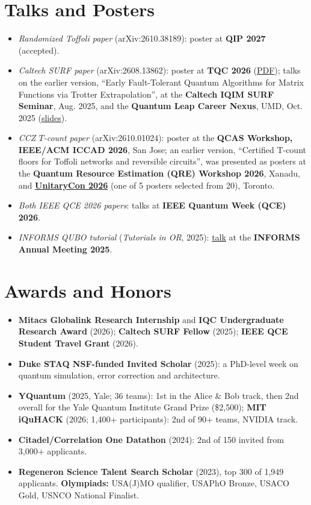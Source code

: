 \documentclass[letterpaper,10pt]{article}
\begin{document}
\section{Talks and Posters}
\begin{itemize}\small
  \item \emph{Randomized Toffoli paper} (arXiv:2610.38189): poster at \textbf{QIP 2027} (accepted).
  \item \emph{Caltech SURF paper} (arXiv:2608.13862): poster at \textbf{TQC 2026}
  (\href{https://arulrhikm.github.io/media/documents/tqc2026-commutator-scaling-poster.pdf}{PDF}); talks on the earlier version, ``Early Fault-Tolerant
  Quantum Algorithms for Matrix Functions via Trotter Extrapolation'', at the \textbf{Caltech IQIM SURF Seminar}, Aug. 2025,
  and the \textbf{Quantum Leap Career Nexus}, UMD, Oct. 2025 (\href{https://arulrhikm.github.io/media/documents/surf2025-matrix-functions-slides.pdf}{slides}).
  \item \emph{CCZ $T$-count paper} (arXiv:2610.01024): poster at the \textbf{QCAS Workshop, IEEE/ACM ICCAD 2026}, San Jose;
  an earlier version, ``Certified T-count floors for Toffoli networks and reversible circuits'', was presented as posters at
  the \textbf{Quantum Resource Estimation (QRE) Workshop 2026}, Xanadu, and \href{https://unitary.foundation/posts/2026_ucon_recap/}{\textbf{UnitaryCon 2026}} (one of 5 posters selected from 20), Toronto.
  \item \emph{Both IEEE QCE 2026 papers}: talks at \textbf{IEEE Quantum Week (QCE) 2026}.
  \item \emph{INFORMS QUBO tutorial} (\textit{Tutorials in OR}, 2025): \href{https://arulrhikm.github.io/media/slides/QUBOonQCslides.pdf}{talk} at the \textbf{INFORMS Annual Meeting 2025}.
\end{itemize}

\section{Awards and Honors}
\begin{itemize}\small
  \item \textbf{Mitacs Globalink Research Internship} and \textbf{IQC Undergraduate Research Award} (2026);
  \textbf{Caltech SURF Fellow} (2025); \textbf{IEEE QCE Student Travel Grant} (2026).
  \item \textbf{Duke STAQ NSF-funded Invited Scholar} (2025): a PhD-level week on quantum simulation, error correction and architecture.
  \item \textbf{YQuantum} (2025, Yale; 36 teams): 1st in the Alice \& Bob track, then 2nd overall for the Yale Quantum Institute Grand Prize (\$2,500); \textbf{MIT iQuHACK} (2026; 1,400+ participants): 2nd of 90+ teams, NVIDIA track.
  \item \textbf{Citadel/Correlation One Datathon} (2024): 2nd of 150 invited from 3,000+ applicants.
  \item \textbf{Regeneron Science Talent Search Scholar} (2023), top 300 of 1,949 applicants. \textbf{Olympiads:}
  USA(J)MO qualifier, USAPhO Bronze, USACO Gold, USNCO National Finalist.
\end{itemize}
\end{document}
